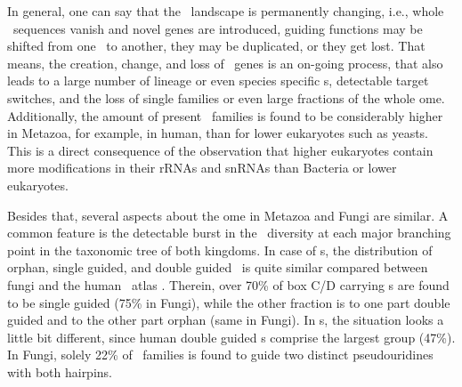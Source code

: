 In general, one can say that the \sno\ landscape is permanently
changing, i.e., whole \sno\ sequences vanish and novel genes are
introduced, guiding functions may be shifted from one \sno\ to
another, they may be duplicated, or they get lost.
That means, the creation, change, and loss of \sno\ genes is an
on-going process, that also leads to a large number of lineage or even
species specific \sno s, detectable target switches, and the loss of
single families or even large fractions of the whole \sno
ome. Additionally, the amount of present \sno\ families is found to be 
considerably higher in Metazoa, for example, in human, than for lower
eukaryotes such as yeasts. This is a direct consequence of the observation that higher eukaryotes contain more modifications in their rRNAs and snRNAs than Bacteria or lower eukaryotes. 

Besides that, several aspects about the \sno ome in Metazoa and Fungi
are similar. A common feature is the detectable burst in the \sno\
diversity at each major branching point in the taxonomic tree of both kingdoms.
In case of \cd s, the distribution of orphan, single guided, and
double guided \snos\ is quite similar compared between fungi and the
human \sno\ atlas \citep{Jorjani:2016}. Therein, over 70\% of box C/D
carrying \sno s are found to be single guided (75\% in Fungi), while the other
fraction is to one part double guided and to the other part orphan
(same in Fungi). In \haca s, the situation looks a little bit
different, since human double guided \sno s comprise the largest
group (47\%). In Fungi, solely 22\% of \haca\ families is found to
guide two distinct pseudouridines with both hairpins. 